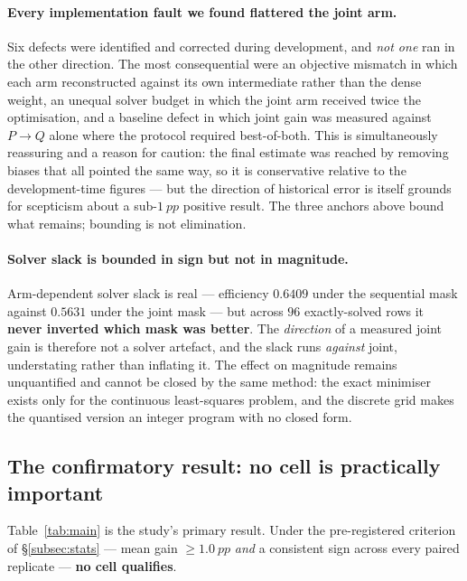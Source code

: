 \paragraph{Every implementation fault we found flattered the joint arm.} Six defects were
identified and corrected during development, and \emph{not one} ran in the other direction.
The most consequential were an objective mismatch in which each arm reconstructed against its
own intermediate rather than the dense weight, an unequal solver budget in which the joint arm
received twice the optimisation, and a baseline defect in which joint gain was measured
against $P{\to}Q$ alone where the protocol required best-of-both. This is simultaneously
reassuring and a reason for caution: the final estimate was reached by removing biases that
all pointed the same way, so it is conservative relative to the development-time figures ---
but the direction of historical error is itself grounds for scepticism about a sub-$\SI{1}{pp}$
positive result. The three anchors above bound what remains; bounding is not elimination.

\paragraph{Solver slack is bounded in sign but not in magnitude.} Arm-dependent solver
slack is real --- efficiency $0.6409$ under the sequential mask against $0.5631$ under the
joint mask --- but across $96$ exactly-solved rows it \textbf{never inverted which mask was
better}. The \emph{direction} of a measured joint gain is therefore not a solver artefact, and
the slack runs \emph{against} joint, understating rather than inflating it. The effect on
magnitude remains unquantified and cannot be closed by the same method: the exact minimiser
exists only for the continuous least-squares problem, and the discrete grid makes the
quantised version an integer program with no closed form.

\subsection{The confirmatory result: no cell is practically important}
\label{subsec:headline}

Table~\ref{tab:main} is the study's primary result. Under the pre-registered criterion of
\S\ref{subsec:stats} --- mean gain $\geq \SI{1.0}{pp}$ \emph{and} a consistent sign across
every paired replicate --- \textbf{no cell qualifies}.

